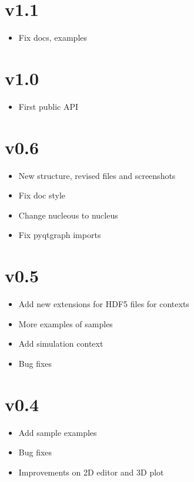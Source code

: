 \documentclass[a4paper,10pt,english]{sphinxmanual}
\begin{document}
\section{v1.1}
\label{\detokenize{changes:v1-1}}\begin{itemize}
\item {} 
Fix docs, examples

\end{itemize}


\section{v1.0}
\label{\detokenize{changes:v1-0}}\begin{itemize}
\item {} 
First public API

\end{itemize}


\section{v0.6}
\label{\detokenize{changes:v0-6}}\begin{itemize}
\item {} 
New structure, revised files and screenshots

\item {} 
Fix doc style

\item {} 
Change nucleous to nucleus

\item {} 
Fix pyqtgraph imports

\end{itemize}


\section{v0.5}
\label{\detokenize{changes:v0-5}}\begin{itemize}
\item {} 
Add new extensions for HDF5 files for contexts

\item {} 
More examples of samples

\item {} 
Add simulation context

\item {} 
Bug fixes

\end{itemize}


\section{v0.4}
\label{\detokenize{changes:v0-4}}\begin{itemize}
\item {} 
Add sample examples

\item {} 
Bug fixes

\item {} 
Improvements on 2D editor and 3D plot

\end{itemize}
\end{document}

